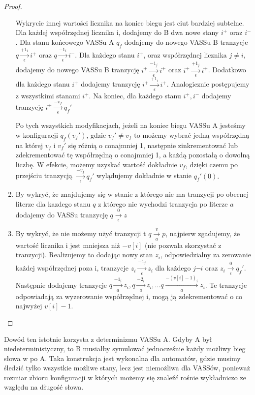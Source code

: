 \begin{proof}
\begin{enumerate}
            Wykrycie innej wartości licznika na koniec biegu jest ciut bardziej subtelne.
            Dla każdej współrzędnej licznika i, dodajemy do B dwa nowe stany $i^+$ oraz $i^-$.
            Dla stanu końcowego VASSu A $q_f$ dodajemy do nowego VASSu B tranzycje $q \xrightarrow[\epsilon]{+1_i} i^+$ oraz
            $q \xrightarrow[\epsilon]{-1_i} i^-$.
            Dla każdego stanu $i^+$, oraz współrzędnej licznika $j \neq i$, dodajemy do nowego VASSu B tranzycję
            $i^+ \xrightarrow[\epsilon]{-1_j} i^+$ oraz $i^+ \xrightarrow[\epsilon]{+1_j} i^+$.
            Dodatkowo dla każdego stanu $i^+$ dodajemy tranzycję  $i^+ \xrightarrow[\epsilon]{+1_i} i^+$.
            Analogicznie postępujemy z wszystkimi stanami $i^+$.
            Na koniec, dla każdego stanu $i^+,i^-$ dodajemy tranzycję $i^+ \xrightarrow[\epsilon]{-v_f} q_f'$

            Po tych wszystkich modyfikacjach, jeżeli na koniec biegu VASSu A jesteśmy w konfiguracji $q_f(v_f')$,
            gdzie $v_f' \neq v_f$ to możemy wybrać jedną współrzędną na której $v_f$ i $v_f'$ się różnią o conajmniej 1,
            następnie zinkrementować lub zdekrementować tę współrzędną o conajmniej 1, a każdą pozostałą o dowolną liczbę.
            W efekcie, możemy uzyskać wartość dokładnie $v_f$, dzięki czemu po przejściu tranzycją
            $\xrightarrow[\epsilon]{-v_f} q_f'$ wylądujemy dokładnie w stanie $q_f'(0).$

            \item By wykryć, że znajdujemy się w stanie z którego nie ma tranzycji po obecnej literze dla kazdego stanu
            $q$ z którego nie wychodzi tranzycja po literze $a$ dodajemy do VASSu tranzycję $ q \xrightarrow[\epsilon]{0} z$

            \item By wykryć, że nie możemy użyć tranzycji t $q \xrightarrow[a]{v} p$, najpierw zgadujemy, że wartość licznika
            i jest mniejsza niż $-v[i]$ (nie pozwala skorzystać z tranzycji).
            Realizujemy to dodając nowy stan $z_i$, odpowiedzialny za zerowanie każdej współrzędnej poza i, tranzycje
            $z_i \xrightarrow[\epsilon]{-1_j} z_i$ dla każdego $j \neg i$ oraz $z_i \xrightarrow[\epsilon]{0} q_f'$.
            Następnie dodajemy tranzycje $q \xrightarrow[a]{-1_i} z_i, q \xrightarrow[a]{-2_i} z_i, \dots q \xrightarrow[a]{-(v[i]-1)_i} z_i$.
            Te tranzycje odpowiadają za wyzerowanie współrzędnej i, mogą ją zdekrementować o co najwyżej $v[i]-1$.

        \end{enumerate}


    \end{proof}
    Dowód ten istotnie korzysta z determinizmu VASSu A.
    Gdyby A był niedeterministyczny, to B musiałby symulować jednocześnie każdy możliwy bieg słowa w po A.
    Taka konstrukcja jest wykonalna dla automatów, gdzie musimy śledzić tylko wszystkie możliwe stany,
    lecz jest niemożliwa dla VASSów, ponieważ rozmiar zbioru konfiguracji w których możemy się znaleźć rośnie wykładniczo ze względu na długość słowa.


